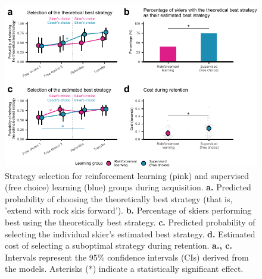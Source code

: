 \documentclass[pdflatex,sn-nature]{sn-jnl}%
\theoremstyle{thmstyleone}%
\theoremstyle{thmstyletwo}%
\theoremstyle{thmstylethree}%
\begin{document}
\begin{figure}[H]
\centering
\includegraphics{figures/figure_choice_estimated_5.pdf}
\caption{Strategy selection for reinforcement learning (pink) and supervised (free choice) learning (blue) groups during acquisition. \textbf{a.} Predicted probability of choosing the theoretically best strategy (that is, 'extend with rock skis forward'). \textbf{b.} Percentage of skiers performing best using the theoretically best strategy. \textbf{c.} Predicted probability of selecting the individual skier's estimated best strategy. \textbf{d.} Estimated cost of selecting a suboptimal strategy during retention. \textbf{a., c.} Intervals represent the 95\% confidence intervals (CIs) derived from the models. Asterisks (*) indicate a statistically significant effect.}\label{fig: choice_estimated}
\end{figure}
\end{document}
